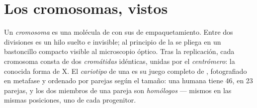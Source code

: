 \section{Los cromosomas, vistos}

\begin{definition}\label{def:g11:cell-cycle-mitosis:chromosome}
Un \emph{cromosoma} es una molécula de  con sus  de
empaquetamiento. Entre dos divisiones es un hilo suelto e invisible; al
principio de la  se pliega en un bastoncillo compacto visible al
microscopio óptico. Tras la replicación, cada cromosoma consta de dos
\emph{cromátidas} idénticas, unidas por el
\emph{centrómero}: la conocida forma de X. El
\emph{cariotipo} de una  es su juego completo
de , fotografiado en metafase y ordenado por parejas según el
tamaño: una  humana tiene 46, en 23 parejas, y los dos miembros
de una pareja son \emph{homólogos} --- mismos  en las mismas
posiciones, uno de cada progenitor.
\end{definition}

